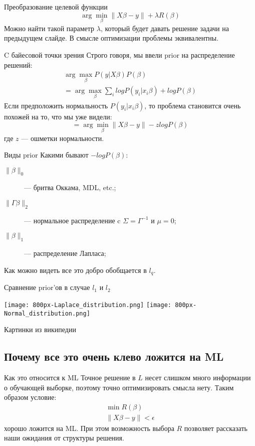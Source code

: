 \documentclass[14pt, fleqn, xcolor={dvipsnames, table}]{beamer}
\begin{document}
\begin{frame}{Преобразование целевой функции}
$$
\arg \min_\beta \| X\beta - y\| + \lambda R(\beta)
$$
Можно найти такой параметр $\lambda$, который будет давать решение задачи на предыдущем слайде. В смысле оптимизации проблемы эквивалентны.
\end{frame}


\begin{frame}{C байесовой точки зрения}
Строго говоря, мы ввели prior на распределение решений:
$$\begin{array}{l}
\arg \max_\beta P(y|X\beta) P(\beta) \\
= \arg \max_\beta \sum_i log P(y_i|x_i\beta) + log P(\beta)
\end{array}$$
Если предположить нормальность $P(y_i|x_i\beta)$, то проблема становится очень похожей на то, что мы уже видели:
$$
= \arg \min_\beta \|X \beta - y\| - z log P(\beta)
$$
где $z$ --- ошметки нормальности.
\end{frame}

\begin{frame}{Виды prior}
Какими бывают $-log P(\beta)$:
\begin{description}
  \item[$\|\beta\|_0$] --- бритва Оккама, MDL, etc.;
  \item[$\|\Gamma\beta\|_2$] --- нормальное распределение c $\Sigma = \Gamma^{-1}$ и $\mu = 0$;
  \item[$\|\beta\|_1$] --- распределение Лапласа;
\end{description}
Как можно видеть все это добро обобщается в $l_q$.
\end{frame}

\begin{frame}{Сравнение prior'ов в случае $l_1$ и $l_2$}
\begin{center}
\texttt{[image: 800px-Laplace\_distribution.png]} 
\texttt{[image: 800px-Normal\_distribution.png]} 
\end{center}
Картинки из википедии
\end{frame}

\subsection{Почему все это очень клево ложится на ML}
\begin{frame}{Как это относится к ML}
Точное решение в $L$ несет слишком много информации о обучающей выборке, поэтому точно оптимизировать смысла нету. Таким образом условие:
$$\begin{array}{l}
\min R(\beta) \\
\|X\beta - y\| < \epsilon
\end{array}$$
хорошо ложится на ML. При этом возможность выбора $R$ позволяет рассказать наши ожидания от структуры решения.
\end{frame}
\end{document}
